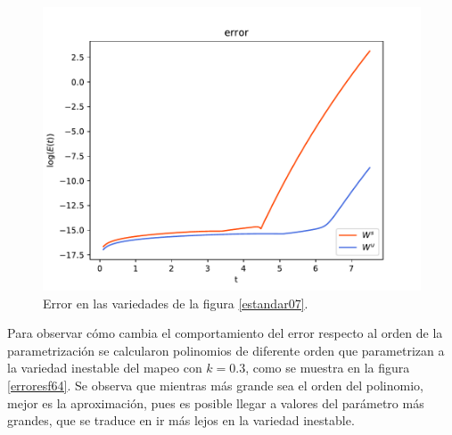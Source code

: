 \begin{figure}[H]
	\centering
	\includegraphics[scale=0.7]{errork07} 
	\caption{Error en las variedades de la figura \ref{estandar07}.}
	\label{error est k07}
\end{figure}



Para observar cómo cambia el comportamiento del error respecto al orden de la parametrización se calcularon polinomios de diferente orden que parametrizan a la variedad inestable del mapeo con $k=0.3$, como se muestra en la figura \ref{erroresf64}. Se observa que mientras más grande sea el orden del polinomio, mejor es la aproximación, pues es posible llegar a valores del parámetro más grandes, que se traduce en ir más lejos en la variedad inestable. \\

